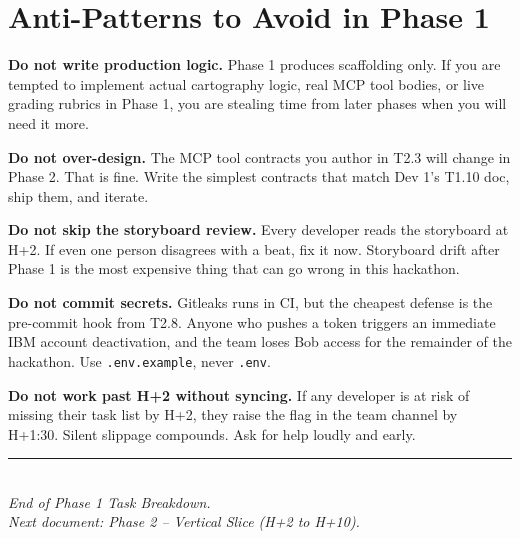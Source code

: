 \documentclass[11pt,letterpaper]{article}
\begin{document}
\section{Anti-Patterns to Avoid in Phase 1}

\begin{warning}
\textbf{Do not write production logic.} Phase 1 produces scaffolding only. If you are tempted to implement actual cartography logic, real MCP tool bodies, or live grading rubrics in Phase 1, you are stealing time from later phases when you will need it more.
\end{warning}

\begin{warning}
\textbf{Do not over-design.} The MCP tool contracts you author in T2.3 will change in Phase 2. That is fine. Write the simplest contracts that match Dev 1's T1.10 doc, ship them, and iterate.
\end{warning}

\begin{warning}
\textbf{Do not skip the storyboard review.} Every developer reads the storyboard at H+2. If even one person disagrees with a beat, fix it now. Storyboard drift after Phase 1 is the most expensive thing that can go wrong in this hackathon.
\end{warning}

\begin{warning}
\textbf{Do not commit secrets.} Gitleaks runs in CI, but the cheapest defense is the pre-commit hook from T2.8. Anyone who pushes a token triggers an immediate IBM account deactivation, and the team loses Bob access for the remainder of the hackathon. Use \texttt{.env.example}, never \texttt{.env}.
\end{warning}

\begin{warning}
\textbf{Do not work past H+2 without syncing.} If any developer is at risk of missing their task list by H+2, they raise the flag in the team channel by H+1:30. Silent slippage compounds. Ask for help loudly and early.
\end{warning}

\vfill

\begin{center}
\rule{0.6\textwidth}{0.6pt}\\
\vspace{0.3em}
{\small\itshape\color{ibmgray} End of Phase 1 Task Breakdown.\\}
{\small\itshape\color{ibmgray} Next document: Phase 2 -- Vertical Slice (H+2 to H+10).}
\end{center}
\end{document}
